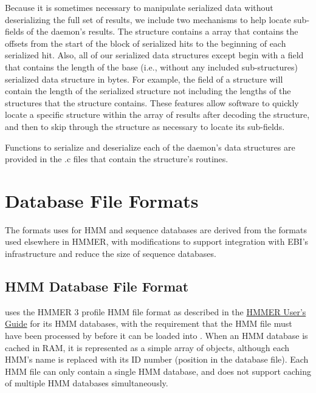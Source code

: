\documentclass[notoc,justified]{tufte-book}    %
\begin{document}
Because it is sometimes necessary to manipulate serialized data without deserializing the full set of results, we include two mechanisms to help locate sub-fields of the daemon's results.  The {} structure contains a  array that contains the offsets from the start of the block of serialized hits to the beginning of each serialized hit.  Also, all of our serialized data structures except {} begin with a  field that contains the length of the base (i.e., without any included sub-structures) serialized data structure in bytes.  For example, the  field of a {} structure will contain the length of the serialized {} structure not including the lengths of the {} structures that the {} structure contains.  These features allow software to quickly locate a specific {} structure within the array of results after decoding the {} structure, and then to skip through the {} structure as necessary to locate its sub-fields.

Functions to serialize and deserialize each of the daemon's data structures are provided in the .c files that contain the structure's routines.     

\chapter{Database File Formats}
The formats  uses for HMM and sequence databases are derived from the formats used elsewhere in HMMER, with modifications to support integration with EBI's infrastructure and reduce the size of sequence databases.

\section{HMM Database File Format}
 uses the HMMER 3 profile HMM file format as described in the \underline{HMMER User's Guide} for its HMM databases, with the requirement that the HMM file must have been processed by  before it can be loaded into .  When an HMM database is cached in RAM, it is represented as a simple array of  objects, although each HMM's name is replaced with its ID number (position in the database file).  Each HMM file can only contain a single HMM database, and  does not support caching of multiple HMM databases simultaneously.
\end{document}
